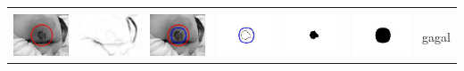 \begin{table}[H]
\begin{tabular}{|m{0.7in}|m{0.7in}|m{0.7in}|m{0.7in}|m{0.7in}|m{0.7in}|m{0.7in}|}
		&  &  & & & &  \\
		\includegraphics[width=0.7in]{dataset/dataset_3/luka_merah/ready/39_integer_init.jpg}&
		\includegraphics[width=0.7in]{dataset/dataset_3/luka_merah/ready/39_integer_ext.jpg}&
		\includegraphics[width=0.7in]{dataset/dataset_3/luka_merah/ready/39_integer_result.jpg}&
		\includegraphics[width=0.7in]{dataset/dataset_3/luka_merah/ready/39_gt_r_integer.jpg}&
		\includegraphics[width=0.7in]{dataset/dataset_3/luka_merah/ready/39_r.jpg}&
		\includegraphics[width=0.7in]{dataset/dataset_3/luka_merah/ready/39_integer_r.jpg}&
		gagal\\
		\hline
		

\end{tabular}
\end{table}

